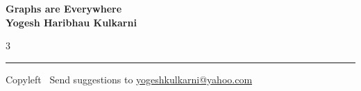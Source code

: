 \documentclass[8pt,landscape]{article}
\begin{document}
\footnotesize


\begin{center}
\Large{\textbf{Graphs are Everywhere\\ Yogesh Haribhau Kulkarni}}
\end{center}

\begin{multicols}{3}

\end{multicols}

\rule{\linewidth}{0.25pt}
\scriptsize
Copyleft \textcopyleft\  Send suggestions to
\href{http://www.yogeshkulkarni.com}{yogeshkulkarni@yahoo.com}
\end{document}
